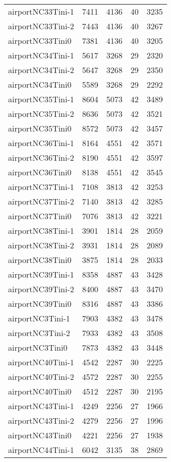 \begin{longtable}{lrrrr}
airportNC33Tini-1 & 7411 & 4136 & 40 & 3235 \\
airportNC33Tini-2 & 7443 & 4136 & 40 & 3267 \\
airportNC33Tini0 & 7381 & 4136 & 40 & 3205 \\
airportNC34Tini-1 & 5617 & 3268 & 29 & 2320 \\
airportNC34Tini-2 & 5647 & 3268 & 29 & 2350 \\
airportNC34Tini0 & 5589 & 3268 & 29 & 2292 \\
airportNC35Tini-1 & 8604 & 5073 & 42 & 3489 \\
airportNC35Tini-2 & 8636 & 5073 & 42 & 3521 \\
airportNC35Tini0 & 8572 & 5073 & 42 & 3457 \\
airportNC36Tini-1 & 8164 & 4551 & 42 & 3571 \\
airportNC36Tini-2 & 8190 & 4551 & 42 & 3597 \\
airportNC36Tini0 & 8138 & 4551 & 42 & 3545 \\
airportNC37Tini-1 & 7108 & 3813 & 42 & 3253 \\
airportNC37Tini-2 & 7140 & 3813 & 42 & 3285 \\
airportNC37Tini0 & 7076 & 3813 & 42 & 3221 \\
airportNC38Tini-1 & 3901 & 1814 & 28 & 2059 \\
airportNC38Tini-2 & 3931 & 1814 & 28 & 2089 \\
airportNC38Tini0 & 3875 & 1814 & 28 & 2033 \\
airportNC39Tini-1 & 8358 & 4887 & 43 & 3428 \\
airportNC39Tini-2 & 8400 & 4887 & 43 & 3470 \\
airportNC39Tini0 & 8316 & 4887 & 43 & 3386 \\
airportNC3Tini-1 & 7903 & 4382 & 43 & 3478 \\
airportNC3Tini-2 & 7933 & 4382 & 43 & 3508 \\
airportNC3Tini0 & 7873 & 4382 & 43 & 3448 \\
airportNC40Tini-1 & 4542 & 2287 & 30 & 2225 \\
airportNC40Tini-2 & 4572 & 2287 & 30 & 2255 \\
airportNC40Tini0 & 4512 & 2287 & 30 & 2195 \\
airportNC43Tini-1 & 4249 & 2256 & 27 & 1966 \\
airportNC43Tini-2 & 4279 & 2256 & 27 & 1996 \\
airportNC43Tini0 & 4221 & 2256 & 27 & 1938 \\
airportNC44Tini-1 & 6042 & 3135 & 38 & 2869 \\

\end{longtable}

